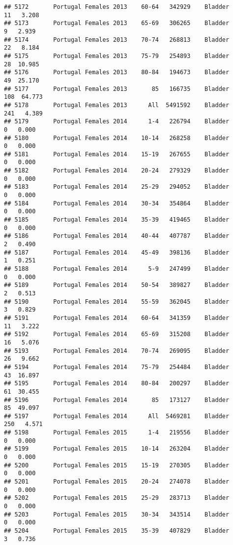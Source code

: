 \documentclass[
]{article}
\begin{document}
\begin{verbatim}
## 5172       Portugal Females 2013    60-64   342929    Bladder     11   3.208
## 5173       Portugal Females 2013    65-69   306265    Bladder      9   2.939
## 5174       Portugal Females 2013    70-74   268813    Bladder     22   8.184
## 5175       Portugal Females 2013    75-79   254893    Bladder     28  10.985
## 5176       Portugal Females 2013    80-84   194673    Bladder     49  25.170
## 5177       Portugal Females 2013       85   166735    Bladder    108  64.773
## 5178       Portugal Females 2013      All  5491592    Bladder    241   4.389
## 5179       Portugal Females 2014      1-4   226794    Bladder      0   0.000
## 5180       Portugal Females 2014    10-14   268258    Bladder      0   0.000
## 5181       Portugal Females 2014    15-19   267655    Bladder      0   0.000
## 5182       Portugal Females 2014    20-24   279329    Bladder      0   0.000
## 5183       Portugal Females 2014    25-29   294052    Bladder      0   0.000
## 5184       Portugal Females 2014    30-34   354864    Bladder      0   0.000
## 5185       Portugal Females 2014    35-39   419465    Bladder      0   0.000
## 5186       Portugal Females 2014    40-44   407787    Bladder      2   0.490
## 5187       Portugal Females 2014    45-49   398136    Bladder      1   0.251
## 5188       Portugal Females 2014      5-9   247499    Bladder      0   0.000
## 5189       Portugal Females 2014    50-54   389827    Bladder      2   0.513
## 5190       Portugal Females 2014    55-59   362045    Bladder      3   0.829
## 5191       Portugal Females 2014    60-64   341359    Bladder     11   3.222
## 5192       Portugal Females 2014    65-69   315208    Bladder     16   5.076
## 5193       Portugal Females 2014    70-74   269095    Bladder     26   9.662
## 5194       Portugal Females 2014    75-79   254484    Bladder     43  16.897
## 5195       Portugal Females 2014    80-84   200297    Bladder     61  30.455
## 5196       Portugal Females 2014       85   173127    Bladder     85  49.097
## 5197       Portugal Females 2014      All  5469281    Bladder    250   4.571
## 5198       Portugal Females 2015      1-4   219556    Bladder      0   0.000
## 5199       Portugal Females 2015    10-14   263204    Bladder      0   0.000
## 5200       Portugal Females 2015    15-19   270305    Bladder      0   0.000
## 5201       Portugal Females 2015    20-24   274078    Bladder      0   0.000
## 5202       Portugal Females 2015    25-29   283713    Bladder      0   0.000
## 5203       Portugal Females 2015    30-34   343514    Bladder      0   0.000
## 5204       Portugal Females 2015    35-39   407829    Bladder      3   0.736

\end{verbatim}
\end{document}
